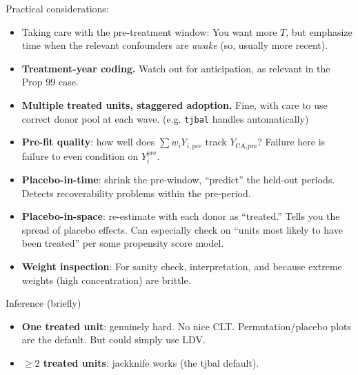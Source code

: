 \documentclass[xcolor=dvipsnames]{beamer}
\newcommand\makegaps{\addtolength{\itemsep}{.25\baselineskip}}
\newcommand{\ypre}{Y^{\text{pre}}_i}      %
\begin{document}
\begin{frame}{Practical considerations:}

\begin{itemize} \makegaps
  \small
\item<1-> Taking care with the pre-treatment window:  You want more $T$, but emphasize time when the relevant confounders are \emph{awake} (so, usually more recent).

\item<2-> \textbf{Treatment-year coding.} Watch out for anticipation, as relevant in the Prop 99 case.

\item<3-> \textbf{Multiple treated units, staggered adoption.} Fine, with care to use correct donor pool at each wave. (e.g. \texttt{tjbal} handles automatically)

\item<4->  \textbf{Pre-fit quality}: how well does $\sum w_i Y_{i,\text{pre}}$ track $Y_{\text{CA},\text{pre}}$? Failure here is failure to even condition on $\ypre$.

\item<5-> \textbf{Placebo-in-time}: shrink the pre-window, ``predict'' the held-out periods. Detects recoverability problems within the pre-period.

\item<6-> \textbf{Placebo-in-space}: re-estimate with each donor as ``treated.'' Tells you the spread of placebo effects. Can especially check on ``units most likely to have been treated'' per some propensity score model.

\item<7-> \textbf{Weight inspection}: For sanity check, interpretation, and because extreme weights (high concentration) are brittle.
\end{itemize}
\end{frame}



\begin{frame}{Inference (briefly)}
 \begin{itemize}\makegaps
   \item<1-> \textbf{One treated unit}: genuinely hard. No nice CLT. Permutation/placebo plots are the default. But could simply use LDV.
   \item<2-> \textbf{$\geq 2$ treated units}: jackknife works (the tjbal default).
 \end{itemize}
\bigskip
 \end{frame}
\end{document}
